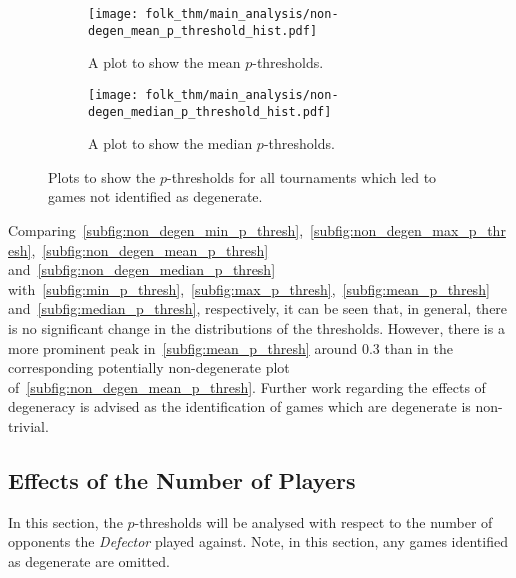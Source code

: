 \begin{figure}
    \begin{subfigure}{0.45\textwidth}
        \centering
        \texttt{[image: folk\_thm/main\_analysis/non-degen\_mean\_p\_threshold\_hist.pdf]}
        \caption{A plot to show the mean \(p\)-thresholds.}\label{subfig:non_degen_mean_p_thresh}
    \end{subfigure}
    \begin{subfigure}{0.45\textwidth}
        \centering
        \texttt{[image: folk\_thm/main\_analysis/non-degen\_median\_p\_threshold\_hist.pdf]}
        \caption{A plot to show the median \(p\)-thresholds.}\label{subfig:non_degen_median_p_thresh}
    \end{subfigure}
    \caption{Plots to show the \(p\)-thresholds for all tournaments which led to games not identified as degenerate.}\label{fig:non_degen_mean_median_p_thresh}
\end{figure}

Comparing~\autoref{subfig:non_degen_min_p_thresh},~\autoref{subfig:non_degen_max_p_thresh},~\autoref{subfig:non_degen_mean_p_thresh}
and~\autoref{subfig:non_degen_median_p_thresh} with~\autoref{subfig:min_p_thresh},~\autoref{subfig:max_p_thresh},~\autoref{subfig:mean_p_thresh}
and~\autoref{subfig:median_p_thresh}, respectively, it can be seen that, in general,
there is no significant change in the distributions of the thresholds. However,
there is a more prominent peak in~\autoref{subfig:mean_p_thresh} around 0.3
than in the corresponding potentially non-degenerate plot of~\autoref{subfig:non_degen_mean_p_thresh}. Further work regarding the effects
of degeneracy is advised as the identification of games which are degenerate is non-trivial.

\subsection{Effects of the Number of Players}\label{subsec:Effects_of_the_number_of_Players}
In this section, the \(p\)-thresholds will be analysed with respect to the
number of opponents the \textit{Defector} played against. Note, in this section,
any games identified as degenerate are omitted.


